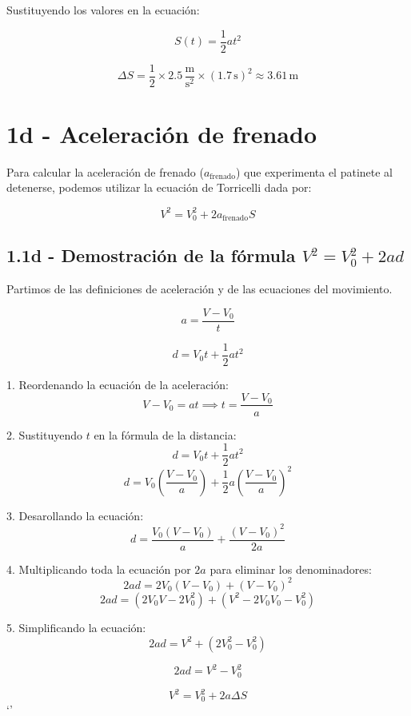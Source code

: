 \documentclass{article}
\begin{document}
Sustituyendo los valores en la ecuación:

\[
    S(t) = \frac{1}{2} a t^2
\]

\[
    \Delta S = \frac{1}{2} \times 2.5 \, \frac{\text{m}}{\text{s}^2} \times (1.7 \, \text{s})^2 \approx \boxed{3.61 \, \text{m}}
\]


\section*{1d - Aceleración de frenado}

Para calcular la aceleración de frenado (\(a_{\text{frenado}}\)) que experimenta el patinete al detenerse, podemos utilizar la ecuación de Torricelli dada por:

\[
V^2 = V_0^2 + 2 a_{\text{frenado}} S
\]


\subsection*{1.1d - Demostración de la fórmula \( V^2 = V_0^2 + 2ad \)}
Partimos de las definiciones de aceleración y de las ecuaciones del movimiento.

\[
a = \frac{V - V_0}{t}
\]

\[
d = V_0 t + \frac{1}{2} a t^2
\]

1. Reordenando la ecuación de la aceleración:
\[
V - V_0 = a t \implies t = \frac{V - V_0}{a}
\]

2. Sustituyendo \(t\) en la fórmula de la distancia:
\[
d = V_0 t + \frac{1}{2} a t^2
\]
\[
d = V_0 \left(\frac{V - V_0}{a}\right) + \frac{1}{2} a \left(\frac{V - V_0}{a}\right)^2
\]

3. Desarollando la ecuación:
\[
d = \frac{V_0 (V - V_0)}{a} + \frac{(V - V_0)^2}{2a}
\]

4. Multiplicando toda la ecuación por \(2a\) para eliminar los denominadores:
\[
2ad = 2V_0 (V - V_0) + (V - V_0)^2
\]
\[
2ad = (2V_0 V - 2V_0^2) + (V^2 - 2V_0 V_0 - V_0^2) 
\]

5. Simplificando la ecuación:
\[
2ad = V^2 + (2V_0^2 - V_0^2) 
\]

\[
2ad = V^2 - V_0^2
\]

\[
\boxed{ V^2=     V_0^2 + 2a\Delta S }
\]
`'
\end{document}
